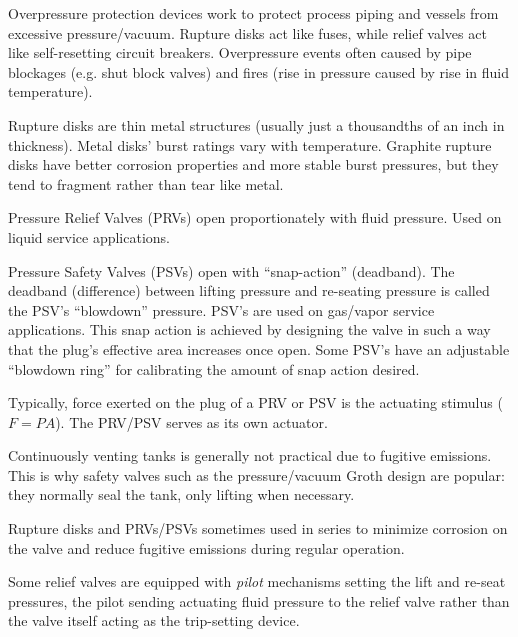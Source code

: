 
Overpressure protection devices work to protect process piping and vessels from excessive pressure/vacuum.  Rupture disks act like fuses, while relief valves act like self-resetting circuit breakers.  Overpressure events often caused by pipe blockages (e.g. shut block valves) and fires (rise in pressure caused by rise in fluid temperature).

\vskip 10pt

Rupture disks are thin metal structures (usually just a thousandths of an inch in thickness).  Metal disks' burst ratings vary with temperature.  Graphite rupture disks have better corrosion properties and more stable burst pressures, but they tend to fragment rather than tear like metal.

\vskip 10pt

Pressure Relief Valves (PRVs) open proportionately with fluid pressure.  Used on liquid service applications.

\vskip 10pt

Pressure Safety Valves (PSVs) open with ``snap-action'' (deadband).  The deadband (difference) between lifting pressure and re-seating pressure is called the PSV's ``blowdown'' pressure.  PSV's are used on gas/vapor service applications.  This snap action is achieved by designing the valve in such a way that the plug's effective area increases once open.  Some PSV's have an adjustable ``blowdown ring'' for calibrating the amount of snap action desired.

\vskip 10pt

Typically, force exerted on the plug of a PRV or PSV is the actuating stimulus ($F = PA$).  The PRV/PSV serves as its own actuator.

\vskip 10pt

Continuously venting tanks is generally not practical due to fugitive emissions.  This is why safety valves such as the pressure/vacuum Groth design are popular: they normally seal the tank, only lifting when necessary.

\vskip 10pt

Rupture disks and PRVs/PSVs sometimes used in series to minimize corrosion on the valve and reduce fugitive emissions during regular operation.

\vskip 10pt

Some relief valves are equipped with {\it pilot} mechanisms setting the lift and re-seat pressures, the pilot sending actuating fluid pressure to the relief valve rather than the valve itself acting as the trip-setting device.

